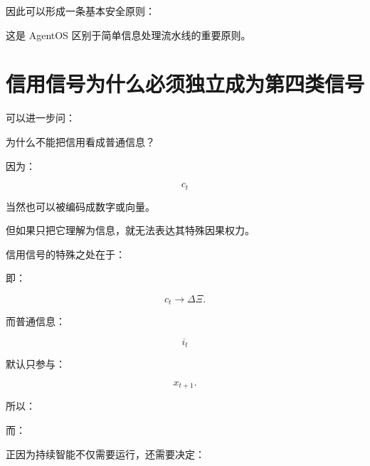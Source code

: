 因此可以形成一条基本安全原则：

\begin{statementbox}
\centering
{}
\end{statementbox}

这是 AgentOS 区别于简单信息处理流水线的重要原则。

\section{信用信号为什么必须独立成为第四类信号}

可以进一步问：

为什么不能把信用看成普通信息？

因为：

\[
c_t
\]

当然也可以被编码成数字或向量。

但如果只把它理解为信息，就无法表达其特殊因果权力。

信用信号的特殊之处在于：

\begin{statementbox}
\centering
{}
\end{statementbox}

即：

\[
c_t
\rightarrow
\Delta\Xi.
\]

而普通信息：

\[
i_t
\]

默认只参与：

\[
x_{t+1}.
\]

所以：

\begin{statementbox}
\centering
{}
\end{statementbox}

而：

\begin{statementbox}
\centering
{}
\end{statementbox}

正因为持续智能不仅需要运行，还需要决定：

\begin{statementbox}
\centering
{}
\end{statementbox}

